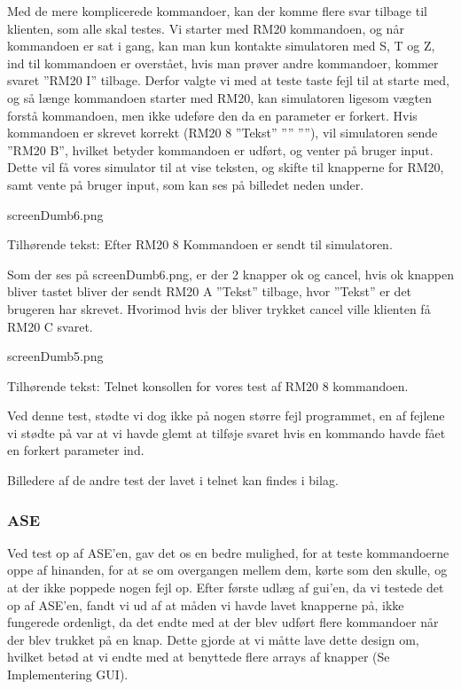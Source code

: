 \documentclass[a4paper]{article}
\begin{document}
Med de mere komplicerede kommandoer, kan der komme flere svar tilbage til klienten, som alle skal testes. Vi starter med RM20 kommandoen, og når kommandoen er sat i gang, kan man kun kontakte simulatoren med S, T og Z, ind til kommandoen er overstået, hvis man prøver andre kommandoer, kommer svaret ”RM20 I” tilbage. Derfor valgte vi med at teste taste fejl til at starte med, og så længe kommandoen starter med RM20, kan simulatoren ligesom vægten forstå kommandoen, men ikke udeføre den da en parameter er forkert. Hvis kommandoen er skrevet korrekt (RM20 8 ”Tekst” ”” ””), vil simulatoren sende ”RM20 B”, hvilket betyder kommandoen er udført, og venter på bruger input. Dette vil få vores simulator til at vise teksten, og skifte til knapperne for RM20, samt vente på bruger input, som kan ses på billedet neden under.

\begin{center}
screenDumb6.png

Tilhørende tekst: Efter RM20 8 Kommandoen er sendt til simulatoren.
\end{center}

Som der ses på screenDumb6.png, er der 2 knapper ok og cancel, hvis ok knappen bliver tastet bliver der sendt RM20 A ”Tekst” tilbage, hvor ”Tekst” er det brugeren har skrevet. Hvorimod hvis der bliver trykket cancel ville klienten få RM20 C svaret.

\begin{center}
screenDumb5.png

Tilhørende tekst: Telnet konsollen for vores test af RM20 8 kommandoen.
\end{center}

Ved denne test, stødte vi dog ikke på nogen større fejl programmet, en af fejlene vi stødte på var at vi havde glemt at tilføje svaret hvis en kommando havde fået en forkert parameter ind.

Billedere af de andre test der lavet i telnet kan findes i bilag.


\subsubsection{ASE} %

Ved test op af ASE’en, gav det os en bedre mulighed, for at teste kommandoerne oppe af hinanden, for at se om overgangen mellem dem, kørte som den skulle, og at der ikke poppede nogen fejl op. Efter første udlæg af gui’en, da vi testede det op af ASE’en, fandt vi ud af at måden vi havde lavet knapperne på, ikke fungerede ordenligt, da det endte med at der blev udført flere kommandoer når der blev trukket på en knap. Dette gjorde at vi måtte lave dette design om, hvilket betød at vi endte med at benyttede flere arrays af knapper (Se Implementering GUI).
\end{document}
